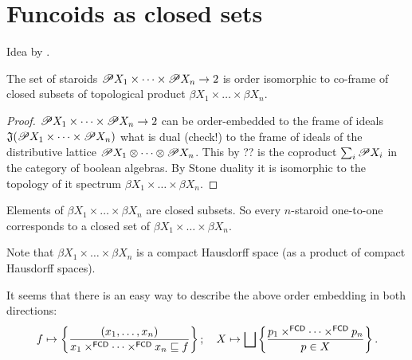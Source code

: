 \chapter{Funcoids as closed sets}

Idea \cite{nlab-topogeny} by .



\begin{thm}
The set of staroids
$\mathscr{P} X_1\times\dots\times\mathscr{P} X_n\to 2$ is
order isomorphic to co-frame of closed subsets of topological
product $\beta X_1\times\dots\times\beta X_n$.
\end{thm}

\begin{proof}
$\mathscr{P} X_1\times\dots\times\mathscr{P} X_n\to 2$ can be order-embedded to
the frame of ideals
$\mathfrak{J}(\mathscr{P} X_1\times\dots\times\mathscr{P} X_n)$ what is
dual (check!) to the frame of ideals of the distributive lattice
$\mathscr{P} X_1\otimes\dots\otimes\mathscr{P} X_n$.
This by ?? is the coproduct $\sum_i \mathscr{P} X_i$ in the category
of boolean algebras.
By Stone duality it is isomorphic to the topology of it spectrum
$\beta X_1\times\dots\times\beta X_n$.
\end{proof}

Elements of $\beta X_1\times\dots\times\beta X_n$ are closed
subsets. So every $n$-staroid one-to-one corresponds to a closed
set of $\beta X_1\times\dots\times\beta X_n$.

Note that $\beta X_1\times\dots\times\beta X_n$ is a compact
Hausdorff space (as a product of compact Hausdorff spaces).

It seems that there is an easy way to describe the above order
embedding in both directions:
\[
f\mapsto
\setcond{(x_1,\dots,x_n)}{
x_1\times^{\mathsf{FCD}}\dots\times^{\mathsf{FCD}}x_n\sqsubseteq f};\quad
X\mapsto \bigsqcup
\setcond{p_1\times^{\mathsf{FCD}}\dots\times^{\mathsf{FCD}}p_n}{
p\in X}.
\]

